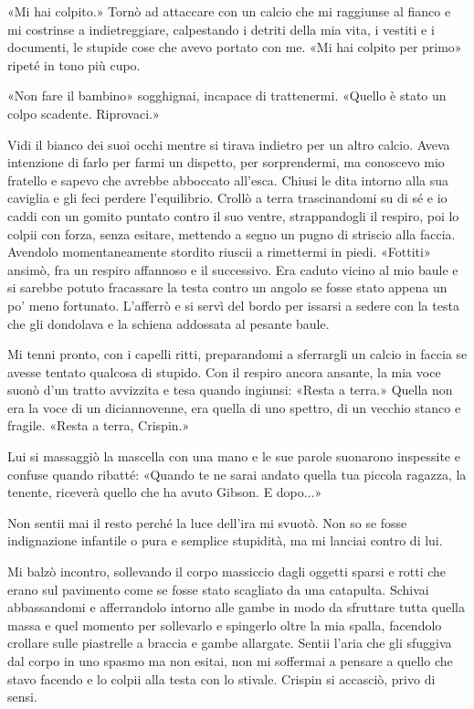 «Mi hai colpito.» Tornò ad attaccare con un calcio che mi raggiunse al
fianco e mi costrinse a indietreggiare, calpestando i detriti della mia
vita, i vestiti e i documenti, le stupide cose che avevo portato con me.
«Mi hai colpito per primo» ripeté in tono più cupo.

«Non fare il bambino» sogghignai, incapace di trattenermi. «Quello è
stato un colpo scadente. Riprovaci.»

Vidi il bianco dei suoi occhi mentre si tirava indietro per un altro
calcio. Aveva intenzione di farlo per farmi un dispetto, per
sorprendermi, ma conoscevo mio fratello e sapevo che avrebbe abboccato
all'esca. Chiusi le dita intorno alla sua caviglia e gli feci perdere
l'equilibrio. Crollò a terra trascinandomi su di sé e io caddi con un
gomito puntato contro il suo ventre, strappandogli il respiro, poi lo
colpii con forza, senza esitare, mettendo a segno un pugno di striscio
alla faccia. Avendolo momentaneamente stordito riuscii a rimettermi in
piedi. «Fottiti» ansimò, fra un respiro affannoso e il successivo. Era
caduto vicino al mio baule e si sarebbe potuto fracassare la testa
contro un angolo se fosse stato appena un po' meno fortunato. L'afferrò
e si servì del bordo per issarsi a sedere con la testa che gli dondolava
e la schiena addossata al pesante baule.

Mi tenni pronto, con i capelli ritti, preparandomi a sferrargli un
calcio in faccia se avesse tentato qualcosa di stupido. Con il respiro
ancora ansante, la mia voce suonò d'un tratto avvizzita e tesa quando
ingiunsi: «Resta a terra.» Quella non era la voce di un diciannovenne,
era quella di uno spettro, di un vecchio stanco e fragile. «Resta a
terra, Crispin.»

Lui si massaggiò la mascella con una mano e le sue parole suonarono
inspessite e confuse quando ribatté: «Quando te ne sarai andato quella
tua piccola ragazza, la tenente, riceverà quello che ha avuto Gibson. E
dopo...»

Non sentii mai il resto perché la luce dell'ira mi svuotò. Non so se
fosse indignazione infantile o pura e semplice stupidità, ma mi lanciai
contro di lui.

Mi balzò incontro, sollevando il corpo massiccio dagli oggetti sparsi e
rotti che erano sul pavimento come se fosse stato scagliato da una
catapulta. Schivai abbassandomi e afferrandolo intorno alle gambe in
modo da sfruttare tutta quella massa e quel momento per sollevarlo e
spingerlo oltre la mia spalla, facendolo crollare sulle piastrelle a
braccia e gambe allargate. Sentii l'aria che gli sfuggiva dal corpo in
uno spasmo ma non esitai, non mi soffermai a pensare a quello che stavo
facendo e lo colpii alla testa con lo stivale. Crispin si accasciò,
privo di sensi.

